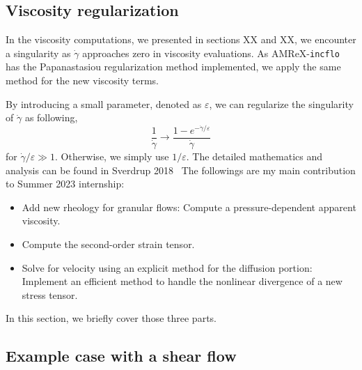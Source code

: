 \subsection{Viscosity regularization}
In the viscosity computations, we presented in sections XX and XX, we encounter a singularity as $\dot{\gamma}$ approaches zero in viscosity evaluations. 
As AMReX-\verb+incflo+ has the Papanastasiou regularization method implemented, we apply the same method for the new viscosity terms.
\par
By introducing a small parameter, denoted as $\varepsilon$, we can regularize the singularity of $\dot{\gamma}$ as following,
\[
  \frac{1}{\dot{\gamma}} \rightarrow \frac{1-e^{-\dot{\gamma} / \varepsilon}}{\dot{\gamma}}  
\]
for $\dot{\gamma}/\varepsilon \gg 1$. Otherwise, we simply use $1/\varepsilon$. 
The detailed mathematics and analysis can be found in Sverdrup 2018~\cite{sverdrup_highly_2018}
 The followings are my main contribution to  Summer 2023 internship:
\begin{itemize}
	\item Add new rheology for granular flows: Compute a pressure-dependent apparent viscosity.
	\item Compute the second-order strain tensor.
	\item Solve for velocity using an explicit method for the diffusion portion: Implement an efficient method to handle the nonlinear divergence of a new stress tensor.
\end{itemize}
In this section, we briefly cover those three parts.
\subsection{Example case with a shear flow}

